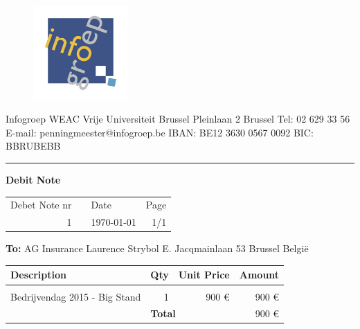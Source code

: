 \documentclass{letter}
\begin{document}
\begin{figure}
  \begin{center}
    \includegraphics[width=0.32\textwidth]{invoices/ig.jpg}
  \end{center}
\end{figure}

Infogroep
\newline
WEAC
\newline
Vrije Universiteit Brussel
\newline
Pleinlaan 2 
 Brussel
\newline
\newline
Tel: 02 629 33 56
\newline
E-mail: penningmeester@infogroep.be
\newline
\newline
IBAN: BE12 3630 0567 0092
\newline
BIC: BBRUBEBB

\rule{\textwidth}{1pt}
\newline


\textbf{\huge{
Debit Note
}}

\begin{tabular}{ r p{10cm} l r}
	Debet Note nr & & Date & Page \\
	1 & & \today & 1/1 \\
\end{tabular} 
\vspace{1cm}


\textbf{To:}
\newline
AG Insurance
\newline
Laurence Strybol
\newline
E. Jacqmainlaan 53
 Brussel
\newline
België




\begin{tabular}{ |p{12cm} | r | r | r |}
	\hline
	\rowcolor{lightgray}
	Description & Qty & Unit Price & Amount \\ [2pt]
	\hline
	&&&\\
	Bedrijvendag 2015 - Big Stand & 1 & 900 \euro & 900  \euro \\[8cm]
	
	\hline
	
	 \multicolumn{1}{c}{}& \multicolumn{2}{|l|}{\cellcolor{lightgray} \textbf{Total}} & 900 \euro\\[2pt]
	\cline{2-4}
	
\end{tabular} 
\end{document}
